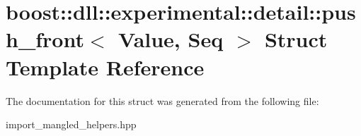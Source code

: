\hypertarget{a00236}{}\section{boost\+:\+:dll\+:\+:experimental\+:\+:detail\+:\+:push\+\_\+front$<$ Value, Seq $>$ Struct Template Reference}
\label{a00236}


The documentation for this struct was generated from the following file\+:\begin{DoxyCompactItemize}
\item 
import\+\_\+mangled\+\_\+helpers.\+hpp\end{DoxyCompactItemize}
